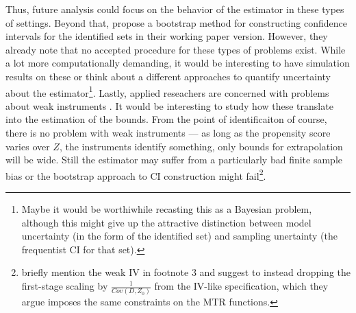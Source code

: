 \documentclass[11pt, a4paper, leqno]{article}
\begin{document}
Thus, future analysis could focus on the behavior of the estimator in these types of settings.
Beyond that, \citet{mogstad2018using} propose a bootstrap method for constructing confidence intervals for the identified sets in their working paper version.
However, they already note that no accepted procedure for these types of problems exist. While a lot more computationally demanding, it would be interesting to have simulation results on these or think about a different approaches to quantify uncertainty about the estimator\footnote{Maybe it would be worthiwhile recasting this as a Bayesian problem, although this might give up the attractive distinction between model uncertainty (in the form of the identified set) and sampling unertainty (the frequentist CI for that set).}.
Lastly, applied reseachers are concerned with problems about weak instruments \citep{andrews2019weak}. It would be interesting to study how these translate into the estimation of the bounds.
From the point of identificaiton of course, there is no problem with weak instruments --- as long as the propensity score varies over $Z$, the instruments identify something, only bounds for extrapolation will be wide. Still the estimator may suffer from a particularly bad finite sample bias or the bootstrap approach to CI construction might fail\footnote{\citet{mogstad2018using} briefly mention the weak IV in footnote 3 and suggest to instead dropping the first-stage scaling by $\frac{1}{Cov(D,Z_0)}$ from the IV-like specification, which they argue imposes the same constraints on the MTR functions.}.


\printbibliography
{}



\end{document}
